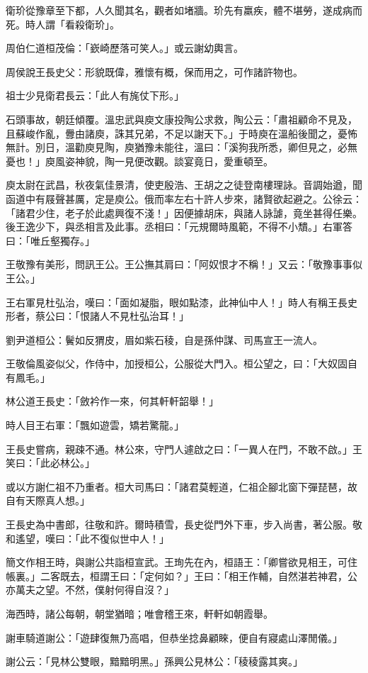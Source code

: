 衛玠從豫章至下都，人久聞其名，觀者如堵牆。玠先有羸疾，體不堪勞，遂成病而死。時人謂「看殺衛玠」。

周伯仁道桓茂倫：「嶔崎歷落可笑人。」或云謝幼輿言。

周侯說王長史父：形貌既偉，雅懷有概，保而用之，可作諸許物也。

祖士少見衛君長云：「此人有旄仗下形。」

石頭事故，朝廷傾覆。溫忠武與庾文康投陶公求救，陶公云：「肅祖顧命不見及，且蘇峻作亂，釁由諸庾，誅其兄弟，不足以謝天下。」于時庾在溫船後聞之，憂怖無計。別日，溫勸庾見陶，庾猶豫未能往，溫曰：「溪狗我所悉，卿但見之，必無憂也！」庾風姿神貌，陶一見便改觀。談宴竟日，愛重頓至。

庾太尉在武昌，秋夜氣佳景清，使吏殷浩、王胡之之徒登南樓理詠。音調始遒，聞函道中有屐聲甚厲，定是庾公。俄而率左右十許人步來，諸賢欲起避之。公徐云：「諸君少住，老子於此處興復不淺！」因便據胡床，與諸人詠謔，竟坐甚得任樂。後王逸少下，與丞相言及此事。丞相曰：「元規爾時風範，不得不小穨。」右軍答曰：「唯丘壑獨存。」

王敬豫有美形，問訊王公。王公撫其肩曰：「阿奴恨才不稱！」又云：「敬豫事事似王公。」

王右軍見杜弘治，嘆曰：「面如凝脂，眼如點漆，此神仙中人！」時人有稱王長史形者，蔡公曰：「恨諸人不見杜弘治耳！」

劉尹道桓公：鬢如反猬皮，眉如紫石稜，自是孫仲謀、司馬宣王一流人。

王敬倫風姿似父，作侍中，加授桓公，公服從大門入。桓公望之，曰：「大奴固自有鳳毛。」

林公道王長史：「斂衿作一來，何其軒軒韶舉！」

時人目王右軍：「飄如遊雲，矯若驚龍。」

王長史嘗病，親疎不通。林公來，守門人遽啟之曰：「一異人在門，不敢不啟。」王笑曰：「此必林公。」

或以方謝仁祖不乃重者。桓大司馬曰：「諸君莫輕道，仁祖企腳北窗下彈琵琶，故自有天際真人想。」

王長史為中書郎，往敬和許。爾時積雪，長史從門外下車，步入尚書，著公服。敬和遙望，嘆曰：「此不復似世中人！」

簡文作相王時，與謝公共詣桓宣武。王珣先在內，桓語王：「卿嘗欲見相王，可住帳裏。」二客既去，桓謂王曰：「定何如？」王曰：「相王作輔，自然湛若神君，公亦萬夫之望。不然，僕射何得自沒？」

海西時，諸公每朝，朝堂猶暗；唯會稽王來，軒軒如朝霞舉。

謝車騎道謝公：「遊肆復無乃高唱，但恭坐捻鼻顧睞，便自有寢處山澤閒儀。」

謝公云：「見林公雙眼，黯黯明黑。」孫興公見林公：「稜稜露其爽。」

